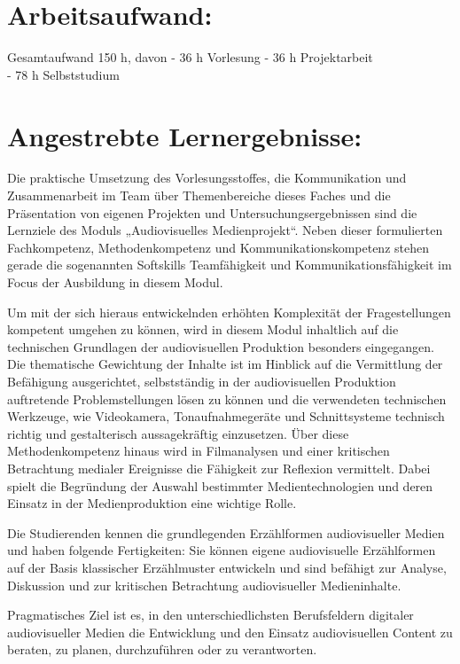 \section{Arbeitsaufwand:}\label{arbeitsaufwand-2}

Gesamtaufwand 150 h, davon - 36 h Vorlesung - 36 h Projektarbeit\\
- 78 h Selbststudium

\section{Angestrebte
Lernergebnisse:}\label{angestrebte-lernergebnisse-2}

Die praktische Umsetzung des Vorlesungsstoffes, die Kommunikation und
Zusammenarbeit im Team über Themenbereiche dieses Faches und die
Präsentation von eigenen Projekten und Untersuchungsergebnissen sind die
Lernziele des Moduls „Audiovisuelles Medienprojekt``. Neben dieser
formulierten Fachkompetenz, Methodenkompetenz und
Kommunikationskompetenz stehen gerade die sogenannten Softskills
Teamfähigkeit und Kommunikationsfähigkeit im Focus der Ausbildung in
diesem Modul.

Um mit der sich hieraus entwickelnden erhöhten Komplexität der
Fragestellungen kompetent umgehen zu können, wird in diesem Modul
inhaltlich auf die technischen Grundlagen der audiovisuellen Produktion
besonders eingegangen. Die thematische Gewichtung der Inhalte ist im
Hinblick auf die Vermittlung der Befähigung ausgerichtet, selbstständig
in der audiovisuellen Produktion auftretende Problemstellungen lösen zu
können und die verwendeten technischen Werkzeuge, wie Videokamera,
Tonaufnahmegeräte und Schnittsysteme technisch richtig und gestalterisch
aussagekräftig einzusetzen. Über diese Methodenkompetenz hinaus wird in
Filmanalysen und einer kritischen Betrachtung medialer Ereignisse die
Fähigkeit zur Reflexion vermittelt. Dabei spielt die Begründung der
Auswahl bestimmter Medientechnologien und deren Einsatz in der
Medienproduktion eine wichtige Rolle.

Die Studierenden kennen die grundlegenden Erzählformen audiovisueller
Medien und haben folgende Fertigkeiten: Sie können eigene audiovisuelle
Erzählformen auf der Basis klassischer Erzählmuster entwickeln und sind
befähigt zur Analyse, Diskussion und zur kritischen Betrachtung
audiovisueller Medieninhalte.

Pragmatisches Ziel ist es, in den unterschiedlichsten Berufsfeldern
digitaler audiovisueller Medien die Entwicklung und den Einsatz
audiovisuellen Content zu beraten, zu planen, durchzuführen oder zu
verantworten.

